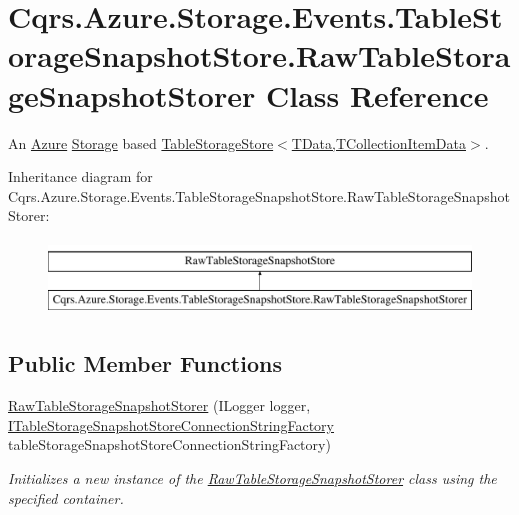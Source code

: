 \hypertarget{classCqrs_1_1Azure_1_1Storage_1_1Events_1_1TableStorageSnapshotStore_1_1RawTableStorageSnapshotStorer}{}\section{Cqrs.\+Azure.\+Storage.\+Events.\+Table\+Storage\+Snapshot\+Store.\+Raw\+Table\+Storage\+Snapshot\+Storer Class Reference}
\label{classCqrs_1_1Azure_1_1Storage_1_1Events_1_1TableStorageSnapshotStore_1_1RawTableStorageSnapshotStorer}


An \hyperlink{namespaceCqrs_1_1Azure}{Azure} \hyperlink{namespaceCqrs_1_1Azure_1_1Storage}{Storage} based \hyperlink{classCqrs_1_1Azure_1_1BlobStorage_1_1Events_1_1TableStorageSnapshotStore_a9b35cccc8db03b41466526f60767ed5f_a9b35cccc8db03b41466526f60767ed5f}{Table\+Storage\+Store$<$\+T\+Data,\+T\+Collection\+Item\+Data$>$}.  


Inheritance diagram for Cqrs.\+Azure.\+Storage.\+Events.\+Table\+Storage\+Snapshot\+Store.\+Raw\+Table\+Storage\+Snapshot\+Storer\+:\begin{figure}[H]
\begin{center}
\leavevmode
\includegraphics[height=2.000000cm]{classCqrs_1_1Azure_1_1Storage_1_1Events_1_1TableStorageSnapshotStore_1_1RawTableStorageSnapshotStorer}
\end{center}
\end{figure}
\subsection*{Public Member Functions}
\begin{DoxyCompactItemize}
\item 
\hyperlink{classCqrs_1_1Azure_1_1Storage_1_1Events_1_1TableStorageSnapshotStore_1_1RawTableStorageSnapshotStorer_a76c9bac0cbad526e8b7b53c7eccce23f_a76c9bac0cbad526e8b7b53c7eccce23f}{Raw\+Table\+Storage\+Snapshot\+Storer} (I\+Logger logger, \hyperlink{interfaceCqrs_1_1Azure_1_1BlobStorage_1_1ITableStorageSnapshotStoreConnectionStringFactory}{I\+Table\+Storage\+Snapshot\+Store\+Connection\+String\+Factory} table\+Storage\+Snapshot\+Store\+Connection\+String\+Factory)
\begin{DoxyCompactList}\small\item\em Initializes a new instance of the \hyperlink{classCqrs_1_1Azure_1_1Storage_1_1Events_1_1TableStorageSnapshotStore_1_1RawTableStorageSnapshotStorer}{Raw\+Table\+Storage\+Snapshot\+Storer} class using the specified container. \end{DoxyCompactList}\end{DoxyCompactItemize}
